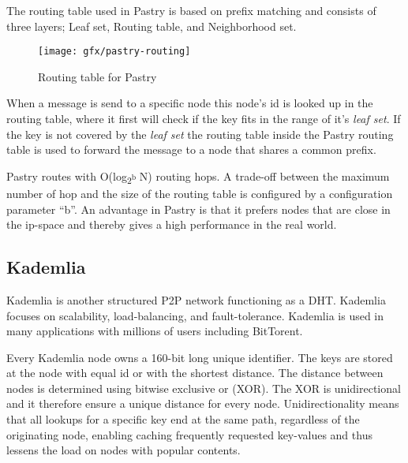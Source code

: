 The routing table used in Pastry is based on prefix matching and consists of three layers; Leaf set, Routing table, and Neighborhood set.
\begin{figure}[bth]
\texttt{[image: gfx/pastry-routing]}
\caption[routingtable]{Routing table for Pastry} \label{fig:pastryrouting}
\end{figure}

When a message is send to a specific node this node's id is looked up in the routing table, where it first will check if the key fits in the range of it's \emph{leaf set}. If the key is not covered by the \emph{leaf set} the routing table inside the Pastry routing table is used to forward the message to a node that shares a common prefix. 

Pastry routes with O(log\textsubscript{2\textsuperscript b} N) routing hops. A trade-off between the maximum number of hop and the size of the routing table is configured by a configuration parameter ``b''.
An advantage in Pastry is that it prefers nodes that are close in the ip-space and thereby gives a high performance in the real world.



\subsection{Kademlia}
Kademlia is another structured P2P network functioning as a DHT. Kademlia focuses on scalability, load-balancing, and fault-tolerance. Kademlia is used in many applications with millions of users including BitTorent.

Every Kademlia node owns a 160-bit long unique identifier. The keys are stored at the node with equal id or with the shortest distance.
The distance between nodes is determined using bitwise exclusive or (XOR). The XOR is unidirectional and it therefore ensure a unique distance for every node. Unidirectionality means that all lookups for a specific key end at the same path, regardless of the originating node, enabling caching frequently requested key-values and thus lessens the load on nodes with popular contents.

